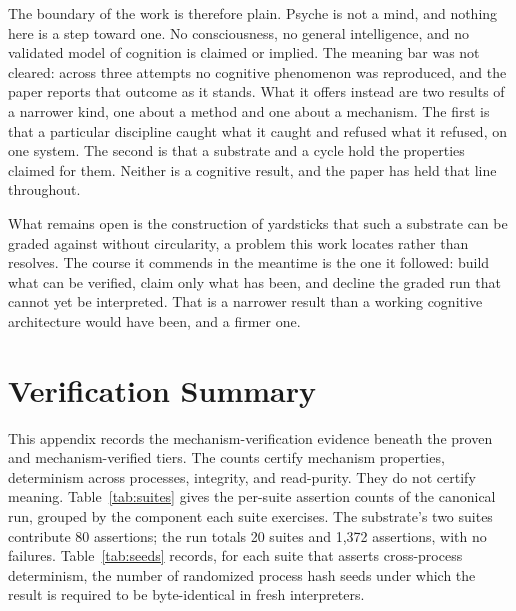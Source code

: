 \documentclass[11pt]{article}
\begin{document}
The boundary of the work is therefore plain. Psyche is not a mind, and nothing here is a
step toward one. No consciousness, no general intelligence, and no validated model of
cognition is claimed or implied. The meaning bar was not cleared: across three attempts no
cognitive phenomenon was reproduced, and the paper reports that outcome as it stands. What
it offers instead are two results of a narrower kind, one about a method and one about a
mechanism. The first is that a particular discipline caught what it caught and refused what
it refused, on one system. The second is that a substrate and a cycle hold the properties
claimed for them. Neither is a cognitive result, and the paper has held that line
throughout.

What remains open is the construction of yardsticks that such a substrate can be graded
against without circularity, a problem this work locates rather than resolves. The course it
commends in the meantime is the one it followed: build what can be verified, claim only what
has been, and decline the graded run that cannot yet be interpreted. That is a narrower
result than a working cognitive architecture would have been, and a firmer one.

\appendix

\section{Verification Summary}\label{app:verification}

This appendix records the mechanism-verification evidence beneath the proven and
mechanism-verified tiers. The counts certify mechanism properties, determinism across
processes, integrity, and read-purity. They do not certify meaning. Table~\ref{tab:suites}
gives the per-suite assertion counts of the canonical run, grouped by the component each
suite exercises. The substrate's two suites contribute 80 assertions; the run totals 20
suites and 1,372 assertions, with no failures. Table~\ref{tab:seeds} records, for each
suite that asserts cross-process determinism, the number of randomized process hash seeds
under which the result is required to be byte-identical in fresh interpreters.
\end{document}
